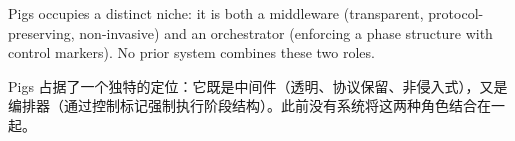 Pigs occupies a distinct niche: it is both a middleware (transparent, protocol-preserving, non-invasive) and an orchestrator (enforcing a phase structure with control markers). No prior system combines these two roles.
\begin{chinese}
Pigs 占据了一个独特的定位：它既是中间件（透明、协议保留、非侵入式），又是编排器（通过控制标记强制执行阶段结构）。此前没有系统将这两种角色结合在一起。
\end{chinese}
